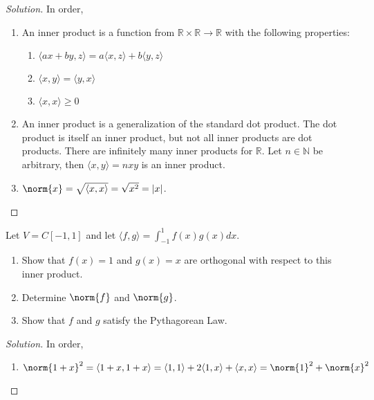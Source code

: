 \documentclass[crop=false,class=book,oneside]{standalone}
\begin{document}
        \begin{proof}[Solution]
        In order,
        \begin{enumerate}
            \item An inner product is a function from $\mathbb{R}\times \mathbb{R}\rightarrow \mathbb{R}$ with the following properties:
            \begin{enumerate}
                \item $\langle ax+by,z\rangle = a\langle x,z\rangle+b\langle y,z\rangle$
                \item $\langle x,y\rangle = \langle y,x \rangle$
                \item $\langle x,x\rangle \geq 0$
            \end{enumerate}
            \item An inner product is a generalization of the standard dot product. The dot product is itself an inner product, but not all inner products are dot products. There are infinitely many inner products for $\mathbb{R}$. Let $n\in \mathbb{N}$ be arbitrary, then $\langle x,y \rangle = nxy$ is an inner product.
            \item $\norm{x} = \sqrt{\langle x,x \rangle } = \sqrt{x^2}= |x|$.
        \end{enumerate}
        \end{proof}
        \begin{problem}
        Let $V = C[-1,1]$ and let $\langle f,g\rangle = \int_{-1}^{1} f(x)g(x)dx$.
        \begin{enumerate}
            \item Show that $f(x)=1$ and $g(x) = x$ are orthogonal with respect to this inner product.
            \item Determine $\norm{f}$ and $\norm{g}$.
            \item Show that $f$ and $g$ satisfy the Pythagorean Law.
        \end{enumerate}
        \end{problem}
        \begin{proof}[Solution]
        In order,
        \begin{enumerate}
            \item $\norm{1+x}^2 = \langle 1+x,1+x\rangle = \langle 1,1\rangle + 2\langle 1,x \rangle + \langle x,x\rangle = \norm{1}^2 + \norm{x}^2$
        \end{enumerate}
        \end{proof}
\end{document}
